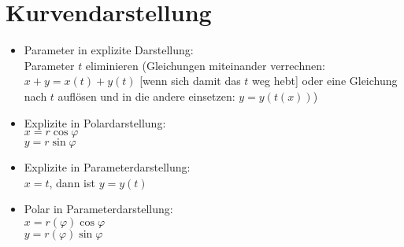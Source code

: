 \section{Kurvendarstellung}
\begin{itemize}
\item Parameter in explizite Darstellung:\\
Parameter $t$ eliminieren (Gleichungen miteinander verrechnen: $x+y=x(t)+y(t)$ [wenn sich damit das $t$ weg hebt] oder eine Gleichung nach $t$ auflösen und in die andere einsetzen: $y=y(t(x))$)
\item Explizite in Polardarstellung:\\
$x=r\cos\varphi$\\
$y=r\sin \varphi$
\item Explizite in Parameterdarstellung:\\
$x=t$, dann ist $y=y(t)$
\item Polar in Parameterdarstellung:\\
$x=r(\varphi)\cos\varphi$\\
$y=r(\varphi) \sin \varphi$
\end{itemize}

